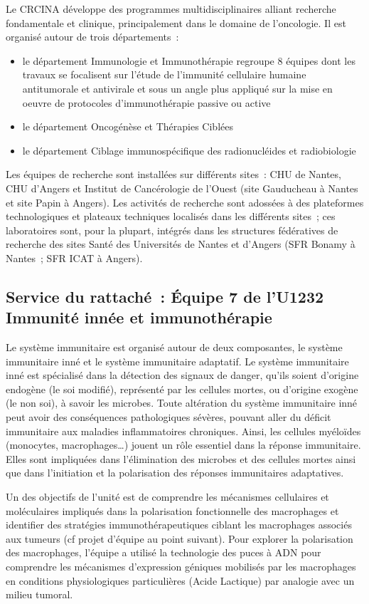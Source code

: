 \documentclass[a4paper,10pt]{article}
\begin{document}
Le CRCINA développe des programmes multidisciplinaires alliant recherche fondamentale et clinique, principalement dans le domaine de l’oncologie. Il est organisé autour de trois départements :
\begin{itemize}
 \item le département \textgravedbl Immunologie et Immunothérapie \textacutedbl  regroupe 8 équipes dont les travaux se focalisent sur l’étude de l’immunité cellulaire humaine antitumorale et antivirale et sous un angle plus appliqué sur la mise en oeuvre de protocoles d’immunothérapie passive ou active
\item le département \textgravedbl Oncogénèse et Thérapies Ciblées \textacutedbl
\item le département \textgravedbl Ciblage immunospécifique des radionucléides et radiobiologie \textacutedbl 
\end{itemize}
Les équipes de recherche sont installées sur différents sites : CHU de Nantes, CHU d’Angers et Institut de Cancérologie de l’Ouest (site Gauducheau à Nantes et site Papin à Angers).
Les activités de recherche sont adossées à des plateformes technologiques et plateaux techniques localisés dans les différents sites ; ces laboratoires sont, pour la plupart, intégrés dans les structures fédératives de recherche des sites Santé des Universités de Nantes et d’Angers (SFR Bonamy à Nantes ; SFR ICAT à Angers).
\subsection{Service du rattaché : Équipe 7 de l’U1232 Immunité innée et immunothérapie}
Le système immunitaire est organisé autour de deux composantes, le système immunitaire inné et le système immunitaire adaptatif. Le système immunitaire inné est spécialisé dans la détection des signaux de danger, qu’ils soient d’origine endogène (le soi modifié), représenté par les cellules mortes, ou d’origine exogène (le non soi), à savoir les microbes. 
Toute altération du système immunitaire inné peut avoir des conséquences pathologiques sévères, pouvant aller du déficit immunitaire aux maladies inflammatoires chroniques. Ainsi, les cellules myéloïdes (monocytes, macrophages…) jouent un rôle essentiel dans la réponse immunitaire. Elles sont impliquées dans l’élimination des microbes et des cellules mortes ainsi que dans l’initiation et la polarisation des réponses immunitaires adaptatives. 

Un des objectifs de l’unité est de comprendre les mécanismes cellulaires et moléculaires impliqués dans la polarisation fonctionnelle des macrophages et identifier des stratégies immunothérapeutiques ciblant les macrophages associés aux tumeurs (cf projet d’équipe au point suivant). 
Pour explorer la polarisation des macrophages, l’équipe a utilisé la technologie des puces à ADN pour comprendre les mécanismes d’expression géniques mobilisés par les macrophages en conditions physiologiques particulières (Acide Lactique) par analogie avec un milieu tumoral. 
\end{document}
